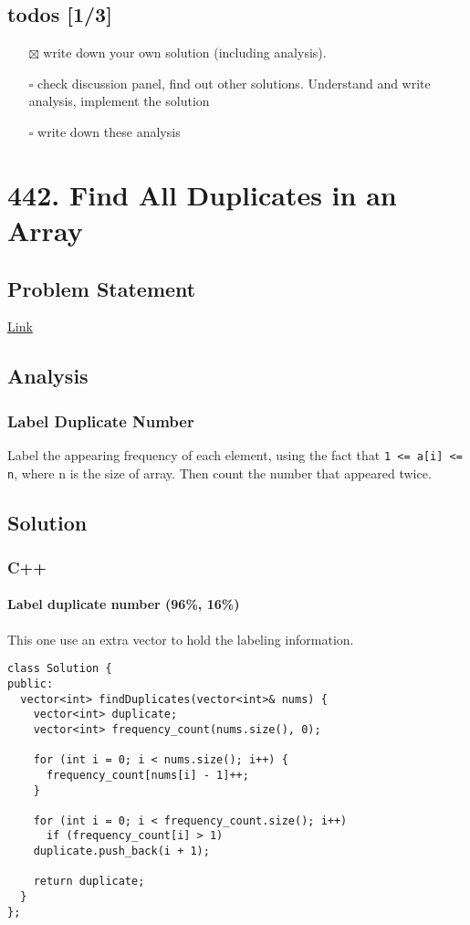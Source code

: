 \documentclass[12pt]{article}
\begin{document}
\subsection{todos [1/3]}
\label{sec:org9155b70}
\begin{itemize}
\item[{$\boxtimes$}] write down your own solution (including analysis).
\item[{$\square$}] check discussion panel, find out other solutions. Understand and write analysis, implement the solution
\item[{$\square$}] write down these analysis
\end{itemize}
\section{442. Find All Duplicates in an Array\label{org7c77290}}
\label{sec:org0d06e25}
\subsection{Problem Statement}
\label{sec:orgb8885a8}
\href{https://leetcode.com/problems/find-all-duplicates-in-an-array/}{Link}
\subsection{Analysis}
\label{sec:org049f4da}
\subsubsection{Label Duplicate Number}
\label{sec:org6115aba}
Label the appearing frequency of each element, using the fact that \texttt{1 <= a[i] <= n}, where n is the size of array. Then count the number that appeared twice.
\subsection{Solution}
\label{sec:orgd045170}
\subsubsection{C++}
\label{sec:org1e1746c}
\paragraph{Label duplicate number (96\%, 16\%)}
\label{sec:orgca574f4}
This one use an extra vector to hold the labeling information.
\begin{verbatim}
class Solution {
public:
  vector<int> findDuplicates(vector<int>& nums) {
    vector<int> duplicate;
    vector<int> frequency_count(nums.size(), 0);

    for (int i = 0; i < nums.size(); i++) {
      frequency_count[nums[i] - 1]++;
    }

    for (int i = 0; i < frequency_count.size(); i++)
      if (frequency_count[i] > 1)
	duplicate.push_back(i + 1);

    return duplicate;
  }
};
\end{verbatim}
\end{document}
